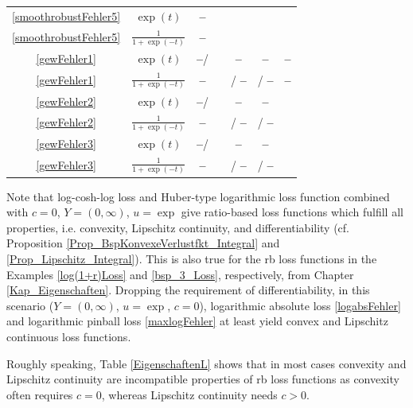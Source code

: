 \documentclass[10pt]{article}
\newcommand{\xmark}{\textbf{--}}
\begin{document}
{\begin{longtable}[c]{|c|c||c|c|c|c|c|}
		\hline
		\eqref{smoothrobustFehler5} & $\exp(t)$ & \xmark & \checkmark & \checkmark & \checkmark & \checkmark \\
		\eqref{smoothrobustFehler5} &$\frac{1}{1+\exp(-t)}$ & \xmark & \checkmark & \checkmark & \checkmark & \checkmark \\
		\hline
		\eqref{gewFehler1} & $\exp(t)$ & \xmark / \checkmark & \checkmark & \xmark & \xmark & \xmark \\
		\eqref{gewFehler1} & $\frac{1}{1+\exp(-t)}$ & \xmark & \checkmark & \checkmark / \xmark & \checkmark / \xmark & \xmark \\
		\hline
		\eqref{gewFehler2} & $\exp(t)$ & \xmark / \checkmark & \checkmark & \xmark & \xmark & \checkmark \\
		\eqref{gewFehler2} & $\frac{1}{1+\exp(-t)}$ & \xmark & \checkmark & \checkmark / \xmark & \checkmark / \xmark & \checkmark\\
		\hline
		\eqref{gewFehler3} & $\exp(t)$ & \xmark / \checkmark & \checkmark & \xmark & \xmark & \checkmark \\
		\eqref{gewFehler3} & $\frac{1}{1+\exp(-t)}$ & \xmark & \checkmark & \checkmark / \xmark & \checkmark / \xmark & \checkmark \\
	\end{longtable}
}
Note that log-cosh-log loss and Huber-type logarithmic loss function combined with $c = 0$, $Y = (0, \infty)$, $u = \exp$ give ratio-based loss functions which fulfill all properties, i.e. convexity, Lipschitz continuity, and differentiability (cf. Proposition \ref{Prop_BspKonvexeVerlustfkt_Integral} and \ref{Prop_Lipschitz_Integral}). 
This is also true for the rb loss functions in the Examples \eqref{log(1+r)Loss} and \eqref{bsp_3_Loss}, respectively, from Chapter \ref{Kap_Eigenschaften}.
Dropping the requirement of differentiability, in this scenario ($Y = (0, \infty)$, $u = \exp$, $c = 0$), logarithmic absolute loss \eqref{logabsFehler} and logarithmic pinball loss \eqref{maxlogFehler} at least yield convex and Lipschitz continuous loss functions. \par
Roughly speaking, Table \ref{EigenschaftenL} shows that in most cases convexity and Lipschitz continuity are incompatible properties of rb loss functions as convexity often requires $c = 0$, whereas Lipschitz continuity needs $c > 0$.
\end{document}
